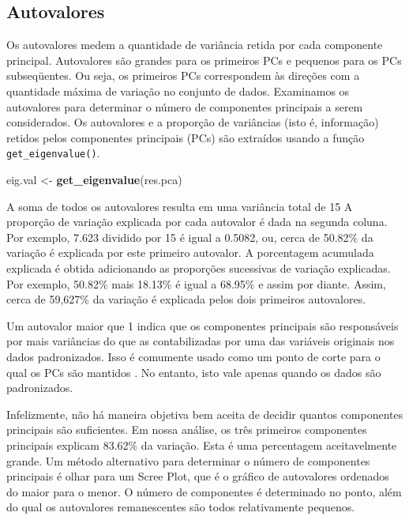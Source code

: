 \documentclass[
]{book}
\newenvironment{Shaded}{\begin{snugshade}}{\end{snugshade}}
\newcommand{\KeywordTok}[1]{\textcolor[rgb]{0.13,0.29,0.53}{\textbf{#1}}}
\newcommand{\NormalTok}[1]{#1}
\newcommand{\StringTok}[1]{\textcolor[rgb]{0.31,0.60,0.02}{#1}}
\begin{document}
\hypertarget{autovalores}{%
\subsection{Autovalores}\label{autovalores}}

Os autovalores medem a quantidade de variância retida por cada componente principal. Autovalores são grandes para os primeiros PCs e pequenos para os PCs subseqüentes. Ou seja, os primeiros PCs correspondem às direções com a quantidade máxima de variação no conjunto de dados. Examinamos os autovalores para determinar o número de componentes principais a serem considerados. Os autovalores e a proporção de variâncias (isto é, informação) retidos pelos componentes principais (PCs) são extraídos usando a função \texttt{get\_eigenvalue()}.

\begin{Shaded}
\begin{Highlighting}[]
\NormalTok{eig.val <-}\StringTok{ }\KeywordTok{get_eigenvalue}\NormalTok{(res.pca)}
\end{Highlighting}
\end{Shaded}

A soma de todos os autovalores resulta em uma variância total de 15 A proporção de variação explicada por cada autovalor é dada na segunda coluna. Por exemplo, 7.623 dividido por 15 é igual a 0.5082, ou, cerca de 50.82\% da variação é explicada por este primeiro autovalor. A porcentagem acumulada explicada é obtida adicionando as proporções sucessivas de variação explicadas. Por exemplo, 50.82\% mais 18.13\% é igual a 68.95\% e assim por diante. Assim, cerca de 59,627\% da variação é explicada pelos dois primeiros autovalores.

\begin{vcsabia}
Um autovalor maior que 1 indica que os componentes principais são responsáveis por mais variâncias do que as contabilizadas por uma das variáveis originais nos dados padronizados. Isso é comumente usado como um ponto de corte para o qual os PCs são mantidos \citep{Kaiser1961}. No entanto, isto vale apenas quando os dados são padronizados.
\end{vcsabia}

Infelizmente, não há maneira objetiva bem aceita de decidir quantos componentes principais são suficientes. Em nossa análise, os três primeiros componentes principais explicam 83.62\% da variação. Esta é uma percentagem aceitavelmente grande. Um método alternativo para determinar o número de componentes principais é olhar para um Scree Plot, que é o gráfico de autovalores ordenados do maior para o menor. O número de componentes é determinado no ponto, além do qual os autovalores remanescentes são todos relativamente pequenos.
\end{document}
